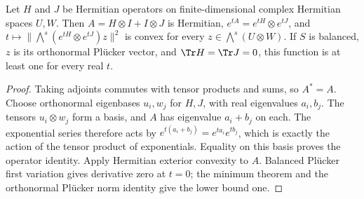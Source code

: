 \begin{lemma}
\label{lem:balanced-tensor-exponential-minimum}
\leanok
{}
Let $H$ and $J$ be Hermitian operators on finite-dimensional complex
Hermitian spaces $U,W$. Then $A=H\otimes I+I\otimes J$ is Hermitian,
$e^{tA}=e^{tH}\otimes e^{tJ}$, and
$t\mapsto\|\bigwedge^s(e^{tH}\otimes e^{tJ})z\|^2$ is convex for every
$z\in\bigwedge^s(U\otimes W)$.
If $S$ is balanced, $z$ is its orthonormal Pl\"ucker vector, and
$\Tr H=\Tr J=0$, this function is at least one for every real $t$.
\end{lemma}
\begin{proof}
Taking adjoints commutes with tensor products and sums, so $A^*=A$.
Choose orthonormal eigenbases $u_i,w_j$ for $H,J$, with real eigenvalues
$a_i,b_j$. The tensors $u_i\otimes w_j$ form a basis, and $A$ has
eigenvalue $a_i+b_j$ on each. The exponential series therefore acts by
$e^{t(a_i+b_j)}=e^{ta_i}e^{tb_j}$, which is exactly the action of the
tensor product of exponentials. Equality on this basis proves the
operator identity. Apply Hermitian exterior convexity to $A$.
Balanced Pl\"ucker first variation gives derivative zero at $t=0$;
the minimum theorem and the orthonormal Pl\"ucker norm identity give
the lower bound one.
\end{proof}

